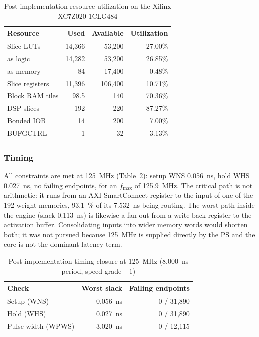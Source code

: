 \documentclass[pdflatex,sn-mathphys-num,iicol]{sn-jnl}
\begin{document}
\begin{table}[htbp]
\centering
\caption{Post-implementation resource utilization on the Xilinx XC7Z020-1CLG484}
\label{tab:resource_utilization}
\begin{tabular*}{\columnwidth}{@{\extracolsep{\fill}}lrrr}
\toprule
Resource & Used & Available & Utilization \\
\midrule
Slice LUTs        & 14{,}366 & 53{,}200  & 27.00\% \\
\quad as logic    & 14{,}282 & 53{,}200  & 26.85\% \\
\quad as memory   &       84 & 17{,}400  &  0.48\% \\
Slice registers   & 11{,}396 & 106{,}400 & 10.71\% \\
Block RAM tiles   &     98.5 & 140       & 70.36\% \\
DSP slices        &      192 & 220       & 87.27\% \\
Bonded IOB        &       14 & 200       &  7.00\% \\
BUFGCTRL          &        1 & 32        &  3.13\% \\
\bottomrule
\end{tabular*}
\end{table}

\subsubsection{Timing}
All constraints are met at \SI{125}{\mega\hertz} (Table~\ref{tab:timing}):
setup WNS \SI{0.056}{\nano\second}, hold WHS \SI{0.027}{\nano\second}, no
failing endpoints, for an $f_{\max}$ of \SI{125.9}{\mega\hertz}. The critical
path is not arithmetic: it runs from an AXI SmartConnect register to the input
of one of the 192 weight memories, \SI{93.1}{\percent} of its
\SI{7.532}{\nano\second} being routing. The worst path inside the engine
(slack \SI{0.113}{\nano\second}) is likewise a fan-out from a write-back register
to the activation buffer. Consolidating inputs into wider memory words would
shorten both; it was not pursued because \SI{125}{\mega\hertz} is supplied
directly by the PS and the core is not the dominant latency term.

\begin{table}[htbp]
\centering
\caption{Post-implementation timing closure at \SI{125}{\mega\hertz}
(\SI{8.000}{\nano\second} period, speed grade $-1$)}
\label{tab:timing}
\begin{tabular*}{\columnwidth}{@{\extracolsep{\fill}}lrr}
\toprule
Check & Worst slack & Failing endpoints \\
\midrule
Setup (WNS)       & \SI{0.056}{\nano\second} & 0 / 31{,}890 \\
Hold (WHS)        & \SI{0.027}{\nano\second} & 0 / 31{,}890 \\
Pulse width (WPWS)& \SI{3.020}{\nano\second} & 0 / 12{,}115 \\
\bottomrule
\end{tabular*}
\end{table}
\end{document}

